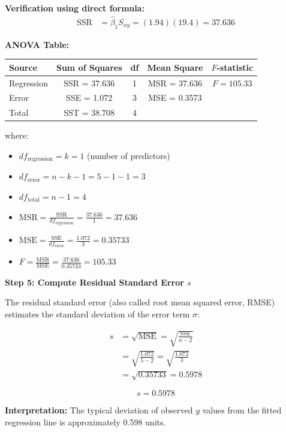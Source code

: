 \documentclass[12pt]{article}
\begin{document}
\begin{solution}
\textbf{Verification using direct formula:}
\begin{align*}
\text{SSR} &= \hat{\beta}_1 S_{xy} = (1.94)(19.4) = 37.636
\end{align*}

\textbf{ANOVA Table:}

\begin{center}
\begin{tabular}{|l|c|c|c|c|}
\hline
\textbf{Source} & \textbf{Sum of Squares} & \textbf{df} & \textbf{Mean Square} & \textbf{$F$-statistic} \\
\hline
Regression & SSR = 37.636 & 1 & MSR = 37.636 & $F = 105.33$ \\
Error & SSE = 1.072 & 3 & MSE = 0.3573 & \\
Total & SST = 38.708 & 4 & & \\
\hline
\end{tabular}
\end{center}

where:
\begin{itemize}
    \item $df_{\text{regression}} = k = 1$ (number of predictors)
    \item $df_{\text{error}} = n - k - 1 = 5 - 1 - 1 = 3$
    \item $df_{\text{total}} = n - 1 = 4$
    \item $\text{MSR} = \frac{\text{SSR}}{df_{\text{regression}}} = \frac{37.636}{1} = 37.636$
    \item $\text{MSE} = \frac{\text{SSE}}{df_{\text{error}}} = \frac{1.072}{3} = 0.35733$
    \item $F = \frac{\text{MSR}}{\text{MSE}} = \frac{37.636}{0.35733} = 105.33$
\end{itemize}

\textbf{Step 5: Compute Residual Standard Error $s$}

The residual standard error (also called root mean squared error, RMSE) estimates the standard deviation of the error term $\sigma$:

\begin{align*}
s &= \sqrt{\text{MSE}} = \sqrt{\frac{\text{SSE}}{n-2}} \\
&= \sqrt{\frac{1.072}{5-2}} = \sqrt{\frac{1.072}{3}} \\
&= \sqrt{0.35733} = 0.5978
\end{align*}

\[
\boxed{s = 0.5978}
\]

\textbf{Interpretation:} The typical deviation of observed $y$ values from the fitted regression line is approximately 0.598 units.


\end{solution}
\end{document}
